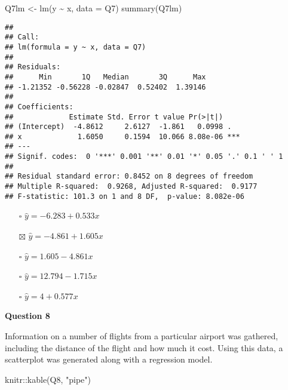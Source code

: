 \documentclass[
]{article}
\newenvironment{Shaded}{\begin{snugshade}}{\end{snugshade}}
\newcommand{\AttributeTok}[1]{\textcolor[rgb]{0.77,0.63,0.00}{#1}}
\newcommand{\FunctionTok}[1]{\textcolor[rgb]{0.00,0.00,0.00}{#1}}
\newcommand{\NormalTok}[1]{#1}
\newcommand{\OtherTok}[1]{\textcolor[rgb]{0.56,0.35,0.01}{#1}}
\newcommand{\SpecialCharTok}[1]{\textcolor[rgb]{0.00,0.00,0.00}{#1}}
\newcommand{\StringTok}[1]{\textcolor[rgb]{0.31,0.60,0.02}{#1}}
\providecommand{\tightlist}{%
  \setlength{\itemsep}{0pt}\setlength{\parskip}{0pt}}
\begin{document}
\begin{Shaded}
\begin{Highlighting}[]
\NormalTok{Q7lm }\OtherTok{\textless{}{-}} \FunctionTok{lm}\NormalTok{(y }\SpecialCharTok{\textasciitilde{}}\NormalTok{ x, }\AttributeTok{data =}\NormalTok{ Q7)}
\FunctionTok{summary}\NormalTok{(Q7lm)}
\end{Highlighting}
\end{Shaded}

\begin{verbatim}
## 
## Call:
## lm(formula = y ~ x, data = Q7)
## 
## Residuals:
##      Min       1Q   Median       3Q      Max 
## -1.21352 -0.56228 -0.02847  0.52402  1.39146 
## 
## Coefficients:
##             Estimate Std. Error t value Pr(>|t|)    
## (Intercept)  -4.8612     2.6127  -1.861   0.0998 .  
## x             1.6050     0.1594  10.066 8.08e-06 ***
## ---
## Signif. codes:  0 '***' 0.001 '**' 0.01 '*' 0.05 '.' 0.1 ' ' 1
## 
## Residual standard error: 0.8452 on 8 degrees of freedom
## Multiple R-squared:  0.9268, Adjusted R-squared:  0.9177 
## F-statistic: 101.3 on 1 and 8 DF,  p-value: 8.082e-06
\end{verbatim}

\begin{itemize}
\tightlist
\item[$\square$]
  \(\hat{y} = −6.283 + 0.533x\)
\item[$\boxtimes$]
  \(\hat{y} = −4.861 + 1.605x\)
\item[$\square$]
  \(\hat{y} = 1.605 − 4.861x\)
\item[$\square$]
  \(\hat{y} = 12.794 − 1.715x\)
\item[$\square$]
  \(\hat{y} = 4 + 0.577x\)
\end{itemize}

\textbf{Question 8}

Information on a number of flights from a particular airport was
gathered, including the distance of the flight and how much it cost.
Using this data, a scatterplot was generated along with a regression
model.

\begin{Shaded}
\begin{Highlighting}[]
\NormalTok{knitr}\SpecialCharTok{::}\FunctionTok{kable}\NormalTok{(Q8, }\StringTok{"pipe"}\NormalTok{)}
\end{Highlighting}
\end{Shaded}
\end{document}
